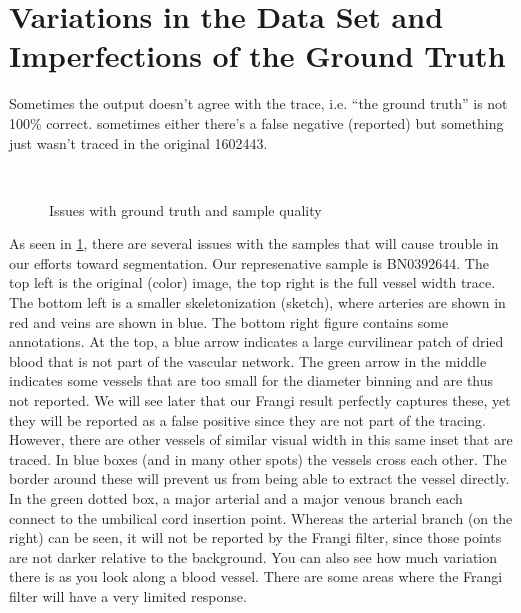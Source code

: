 \section{Variations in the Data Set and Imperfections of the Ground Truth} \label{sec:NCS-dataset-issues}

Sometimes the output doesn't agree with the trace, i.e. ``the ground truth'' is not 100\% correct.
sometimes either there's a false negative (reported) but something just wasn't traced in the original  1602443.

\begin{figure} \centering
 \\
\caption{Issues with ground truth and sample quality}
\label{fig:groundtruth-samplequality}
\end{figure}

As seen in \cref{fig:groundtruth-samplequality}, there are several issues with the samples that will cause trouble in our efforts toward segmentation. Our represenative sample is BN0392644. The top left is the original (color) image, the top right is the full vessel width trace. The bottom left is a smaller skeletonization (sketch), where arteries are shown in red and veins are shown in blue. The bottom right figure contains some annotations. At the top, a blue arrow indicates a large curvilinear patch of dried blood that is not part of the vascular network. The green arrow in the middle indicates some vessels that are too small for the diameter binning and are thus not reported. We will see later that our Frangi result perfectly captures these, yet they will be reported as a false positive since they are not part of the tracing. However, there are other vessels of similar visual width in this same inset that are traced. In blue boxes (and in many other spots) the vessels cross each other. The border around these will prevent us from being able to extract the vessel directly. In the green dotted box, a major arterial and a major venous branch each connect to the umbilical cord insertion point. Whereas the arterial branch (on the right) can be seen, it will not be reported by the Frangi filter, since those points are not darker relative to the background. You can also see how much variation there is as you look along a blood vessel. There are some areas where the Frangi filter will have a very limited response. 



